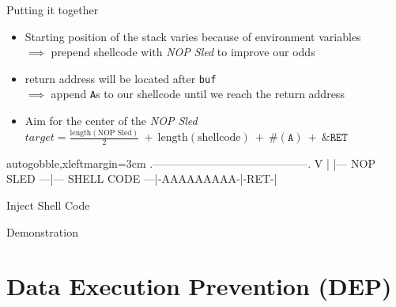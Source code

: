 \documentclass[beamer]{uibk}
\begin{document}
\begin{frame}[fragile]{Putting it together}
    \begin{itemize}
        \item Starting position of the stack varies because of environment
            variables\\
            \medskip
            $\implies$ prepend shellcode with \textit{NOP Sled} to improve our
            odds
        \bigskip
        \item return address will be located after \texttt{buf}\\
            \medskip
            $\implies$ append \texttt{A}s to our shellcode until we reach the
            return address
        \bigskip
        \item Aim for the center of the \textit{NOP Sled}\\
            \medskip
            $\mathit{target} = \frac{\mathrm{length}(\text{NOP Sled})}{2}\ +\ \mathrm{length}(\text{shellcode})\ +\ \#(\texttt{A})\ +\ \texttt{\&RET}$
   \end{itemize}
   \begin{pre*}{autogobble,xleftmargin=3cm}
               .------------------------------------------.
               V                                          |
       |--- NOP SLED ---|--- SHELL CODE ---|-AAAAAAAAA-|-RET-|
   \end{pre*}
\end{frame}

\begin{frame}{Inject Shell Code}
    \begin{center}
        \huge Demonstration
    \end{center}
\end{frame}

\section{Data Execution Prevention (DEP)}
\end{document}

